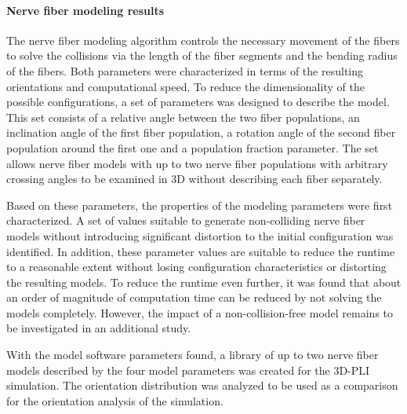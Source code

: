 \paragraph{Nerve fiber modeling results}
% 
The nerve fiber modeling algorithm controls the necessary movement of the fibers to solve the collisions via the length of the fiber segments and the bending radius of the fibers.
Both parameters were characterized in terms of the resulting orientations and computational speed.
To reduce the dimensionality of the possible configurations, a set of parameters was designed to describe the model.
This set consists of a relative angle between the two fiber populations, an inclination angle of the first fiber population, a rotation angle of the second fiber population around the first one and a population fraction parameter.
The set allows nerve fiber models with up to two nerve fiber populations with arbitrary crossing angles to be examined in 3D without describing each fiber separately.
\par
% 
Based on these parameters, the properties of the modeling parameters were first characterized.
A set of values suitable to generate non-colliding nerve fiber models without introducing significant distortion to the initial configuration was identified.
In addition, these parameter values are suitable to reduce the runtime to a reasonable extent without losing configuration characteristics or distorting the resulting models.
To reduce the runtime even further, it was found that about an order of magnitude of computation time can be reduced by not solving the models completely.
However, the impact of a non-collision-free model remains to be investigated in an additional study.
\par
% 
With the model software parameters found, a library of up to two nerve fiber models described by the four model parameters was created for the \ac{3D-PLI} simulation.
The orientation distribution was analyzed to be used as a comparison for the orientation analysis of the simulation.
% 
% 
% 
